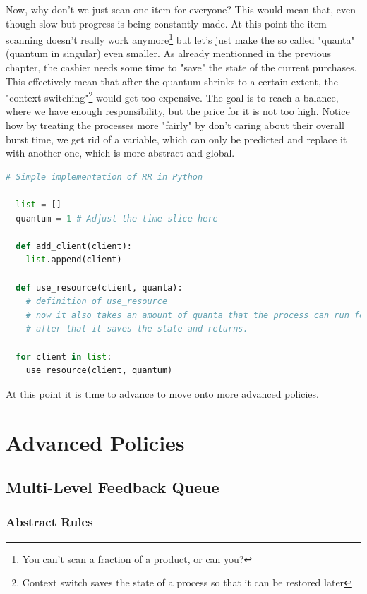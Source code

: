 \documentclass{report}
\newcounter{defi}[section]\setcounter{defi}{0}
\begin{document}
Now, why don't we just scan one item for everyone? 
This would mean that, even though slow but progress is being constantly made.
At this point the item scanning doesn't really work anymore\footnote{You can't scan a fraction of a product, or can you?} but let's just make the so called "quanta" (quantum in singular) even smaller.
As already mentionned in the previous chapter, the cashier needs some time to "save" the state of the current purchases. 
This effectively mean that after the quantum shrinks to a certain extent, the "context switching"\footnote{Context switch saves the state of a process so that it can be restored later} would get too expensive. 
The goal is to reach a balance, where we have enough responsibility, but the price for it is not too high.
Notice how by treating the processes more "fairly" by don't caring about their overall burst time, we get rid of a variable, which can only be predicted and replace it with another one, which is more abstract and global.
\pagebreak
\begin{lstlisting}[language=Python, style=colorEX]
  # Simple implementation of RR in Python

  list = []
  quantum = 1 # Adjust the time slice here

  def add_client(client):
    list.append(client)

  def use_resource(client, quanta):
    # definition of use_resource
    # now it also takes an amount of quanta that the process can run for
    # after that it saves the state and returns.

  for client in list:
    use_resource(client, quantum)

\end{lstlisting}

At this point it is time to advance to move onto more advanced policies.

\part{Advanced Policies}


\chapter{Multi-Level Feedback Queue}

\section{Abstract Rules}
\end{document}
